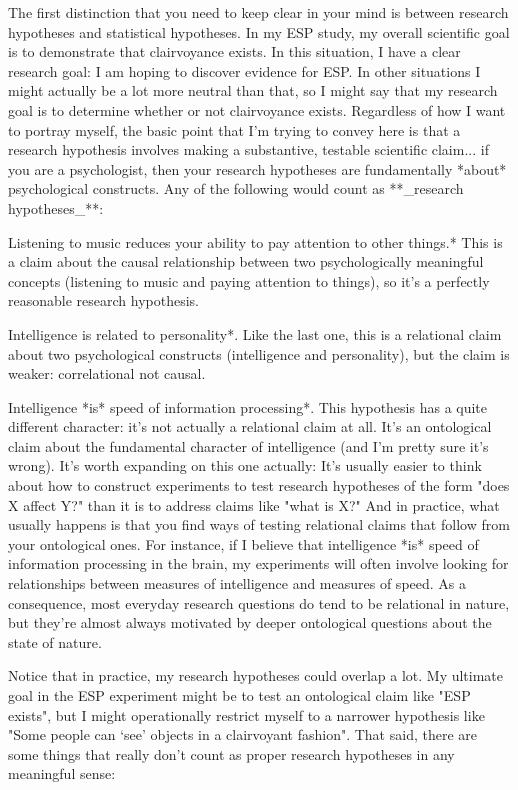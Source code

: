 The first distinction that you need to keep clear in your mind is between  research hypotheses and statistical hypotheses. In my ESP study, my overall scientific goal is to demonstrate that clairvoyance exists. In this situation, I have a clear research goal: I am hoping to discover evidence for ESP. In other situations I might actually be a lot more neutral than that, so I might say that my research goal is to determine whether or not clairvoyance exists. Regardless of how I want to portray myself, the basic point that I'm trying to convey here is that a research hypothesis involves making a substantive, testable scientific claim... if you are a psychologist, then your research hypotheses are fundamentally *about* psychological constructs. Any of the following would count as **_research hypotheses_**:

\item *Listening to music reduces your ability to pay attention to other things.* This is a claim about the causal relationship between two psychologically meaningful concepts (listening to music and paying attention to things), so it's a perfectly reasonable research hypothesis.
\item *Intelligence is related to personality*. Like the last one, this is a relational claim about two psychological constructs (intelligence and personality), but the claim is weaker: correlational not causal.
\item *Intelligence *is* speed of information processing*. This hypothesis has a quite different character: it's not actually a relational claim at all. It's an ontological claim about the fundamental character of intelligence (and I'm pretty sure it's wrong). It's worth expanding on this one actually: It's usually easier to think about how to construct experiments to test research hypotheses of the form "does X affect Y?" than it is to address claims like "what is X?" And in practice, what usually happens is that you find ways of testing relational claims that follow from your ontological ones. For instance, if I believe that intelligence *is* speed of information processing in the brain, my experiments will often involve looking for relationships between measures of intelligence and measures of speed. As a consequence, most everyday research questions do tend to be relational in nature, but they're almost always motivated by deeper ontological questions about the state of nature. 

Notice that in practice, my research hypotheses could overlap a lot. My ultimate goal in the ESP experiment might be to test an ontological claim like "ESP exists", but I might operationally restrict myself to a narrower hypothesis like "Some people can `see' objects in a clairvoyant fashion". That said, there are some things that really don't count as proper research hypotheses in any meaningful sense: 


